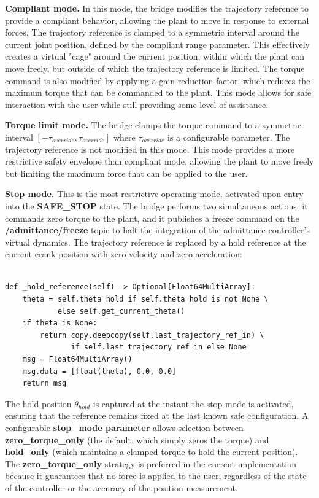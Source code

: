\textbf{Compliant mode.} In this mode, the bridge modifies the trajectory reference to provide a compliant behavior, allowing the plant to move in response to external forces. The trajectory reference is clamped to a symmetric interval around the current joint position, defined by the compliant range parameter. This effectively creates a virtual "cage" around the current position, within which the plant can move freely, but outside of which the trajectory reference is limited. The torque command is also modified by applying a gain reduction factor, which reduces the maximum torque that can be commanded to the plant. This mode allows for safe interaction with the user while still providing some level of assistance.

\textbf{Torque limit mode.} The bridge clamps the torque command to a symmetric interval $[-\tau_{override}, \tau_{override}]$ where $\tau_{override}$ is a configurable parameter. The trajectory reference is not modified in this mode. This mode provides a more restrictive safety envelope than compliant mode, allowing the plant to move freely but limiting the maximum force that can be applied to the user.

\textbf{Stop mode.} This is the most restrictive operating mode, activated upon entry into the \textbf{SAFE\_STOP} state. The bridge performs two simultaneous actions: it commands zero torque to the plant, and it publishes a freeze command on the \textbf{/admittance/freeze} topic to halt the integration of the admittance controller's virtual dynamics. The trajectory reference is replaced by a hold reference at the current crank position with zero velocity and zero acceleration:

\begin{verbatim}

def _hold_reference(self) -> Optional[Float64MultiArray]:
    theta = self.theta_hold if self.theta_hold is not None \
            else self.get_current_theta()
    if theta is None:
        return copy.deepcopy(self.last_trajectory_ref_in) \
               if self.last_trajectory_ref_in else None
    msg = Float64MultiArray()
    msg.data = [float(theta), 0.0, 0.0]
    return msg

\end{verbatim}

The hold position $\theta_{hold}$ is captured at the instant the stop mode is activated, ensuring that the reference remains fixed at the last known safe configuration. A configurable
\textbf{stop\_mode parameter} allows selection between \textbf{zero\_torque\_only} (the default, which simply zeros the torque) and \textbf{hold\_only} (which maintains a clamped torque to hold the current position). The \textbf{zero\_torque\_only} strategy is preferred in the current implementation because it guarantees that no force is applied to the user, regardless of the state of the controller or the accuracy of the position measurement.


